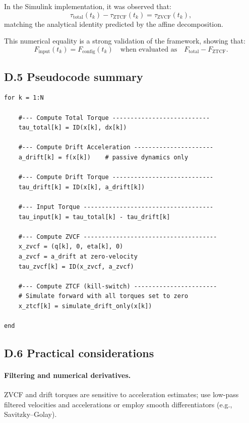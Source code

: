 \documentclass[12pt]{article}
\begin{document}
In the Simulink implementation, it was observed that:
\[
  \tau_{\mathrm{total}}(t_k) - \tau_{\mathrm{ZTCF}}(t_k)
  =
  \tau_{\mathrm{ZVCF}}(t_k),
\]
matching the analytical identity predicted by the affine decomposition.

This numerical equality is a strong validation of the framework, showing that:
\[
  F_{\mathrm{input}}(t_k)
  = 
  F_{\mathrm{config}}(t_k)
  \quad\text{when evaluated as}\quad
  F_{\mathrm{total}} - F_{\mathrm{ZTCF}}.
\]

\subsection{D.5 \quad Pseudocode summary}

\begin{verbatim}
for k = 1:N

    #--- Compute Total Torque ---------------------------
    tau_total[k] = ID(x[k], dx[k])

    #--- Compute Drift Acceleration ----------------------
    a_drift[k] = f(x[k])    # passive dynamics only

    #--- Compute Drift Torque ----------------------------
    tau_drift[k] = ID(x[k], a_drift[k])

    #--- Input Torque ------------------------------------
    tau_input[k] = tau_total[k] - tau_drift[k]

    #--- Compute ZVCF -------------------------------------
    x_zvcf = (q[k], 0, eta[k], 0)
    a_zvcf = a_drift at zero-velocity
    tau_zvcf[k] = ID(x_zvcf, a_zvcf)

    #--- Compute ZTCF (kill-switch) -----------------------
    # Simulate forward with all torques set to zero
    x_ztcf[k] = simulate_drift_only(x[k])

end
\end{verbatim}

\subsection{D.6 \quad Practical considerations}

\paragraph{Filtering and numerical derivatives.}
ZVCF and drift torques are sensitive to acceleration estimates; use low-pass filtered velocities and accelerations or employ smooth differentiators (e.g., Savitzky–Golay).
\end{document}
